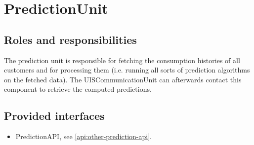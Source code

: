 \section{PredictionUnit}
\label{element:prediction-unit}

\subsection{Roles and responsibilities}

\npar The prediction unit is responsible for fetching the consumption
histories of all customers and for processing them (i.e. running all sorts of
prediction algorithms on the fetched data). The UISCommunicationUnit can
afterwards contact this component to retrieve the computed predictions.

\subsection{Provided interfaces}

\begin{itemize}
  \item PredictionAPI, see \ref{api:other-prediction-api}.
\end{itemize}